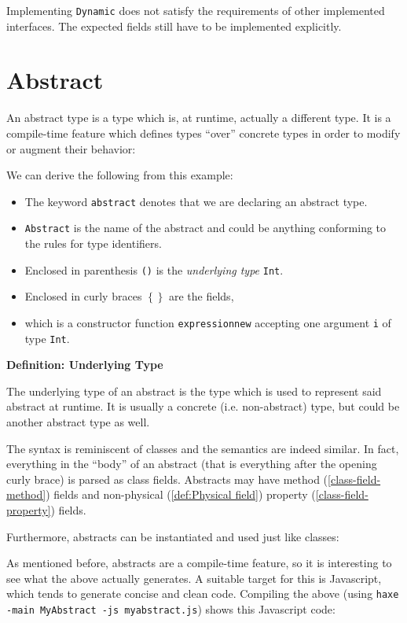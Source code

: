 \documentclass[a4paper,oneside]{book}
\newcommand{\target}[1]{#1}
\newcommand{\type}[1]{\texttt{#1}}
\newcommand{\expr}[1]{\texttt{#1}}
\newenvironment{myshaded}
  {\def\FrameCommand{\fboxsep=\topsep\colorbox{bgcolor}}%
  \MakeFramed {\advance\hsize-\width \FrameRestore}}%
 {\endMakeFramed}
\newcommand{\define}[3][Definition]
	{\begin{myshaded}\noindent\textbf{#1: #2}\par\nobreak\noindent\ignorespaces#3\label{def:#2}\end{myshaded}}
\newcommand{\tref}[2]{#1 (\ref{#2})}
\newcommand{\haxe}[2][]{%
}
\begin{document}
\haxe{assets/ImplementsDynamic.hx}
Implementing \type{Dynamic} does not satisfy the requirements of other implemented interfaces. The expected fields still have to be implemented explicitly.





\section{Abstract}
\label{types-abstract}

An abstract type is a type which is, at runtime, actually a different type. It is a compile-time feature which defines types ``over'' concrete types in order to modify or augment their behavior:

\haxe[firstline=1,lastline=5]{assets/MyAbstract.hx}
We can derive the following from this example:

\begin{itemize}
	\item The keyword \expr{abstract} denotes that we are declaring an abstract type.
	\item \type{Abstract} is the name of the abstract and could be anything conforming to the rules for type identifiers.
	\item Enclosed in parenthesis \expr{()} is the \emph{underlying type} \type{Int}.
	\item Enclosed in curly braces \expr{$\left\{\right\}$} are the fields,
	\item which is a constructor function \expr{expressionnew} accepting one argument \expr{i} of type \type{Int}.
\end{itemize}

\define{Underlying Type}{The underlying type of an abstract is the type which is used to represent said abstract at runtime. It is usually a concrete (i.e. non-abstract) type, but could be another abstract type as well.}

The syntax is reminiscent of classes and the semantics are indeed similar. In fact, everything in the ``body'' of an abstract (that is everything after the opening curly brace) is parsed as class fields. Abstracts may have \tref{method}{class-field-method} fields and non-\tref{physical}{def:Physical field} \tref{property}{class-field-property} fields.

Furthermore, abstracts can be instantiated and used just like classes:

\haxe[firstline=7,lastline=12]{assets/MyAbstract.hx}
As mentioned before, abstracts are a compile-time feature, so it is interesting to see what the above actually generates. A suitable target for this is \target{Javascript}, which tends to generate concise and clean code. Compiling the above (using \texttt{haxe -main MyAbstract -js myabstract.js}) shows this \target{Javascript} code:
\end{document}
